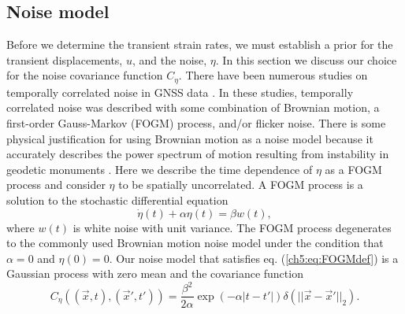 \subsection{Noise model}\label{ch5:sec:NoiseModel}
Before we determine the transient strain rates, we must establish a
prior for the transient displacements, $u$, and the noise, $\eta$. In
this section we discuss our choice for the noise covariance function
$C_\eta$. There have been numerous studies on temporally correlated
noise in GNSS data \citep[e.g.,][]{Zhang1997, Mao1999, Williams2004,
Langbein2008}. In these studies, temporally correlated noise was
described with some combination of Brownian motion, a first-order
Gauss-Markov (FOGM) process, and/or flicker noise. There is some
physical justification for using Brownian motion as a noise model
because it accurately describes the power spectrum of motion resulting
from instability in geodetic monuments \citep[e.g.,][]{Wyatt1982,
Wyatt1989}. Here we describe the time dependence of $\eta$ as a FOGM
process and consider $\eta$ to be spatially uncorrelated. A FOGM
process is a solution to the stochastic differential equation
\begin{equation}\label{ch5:eq:FOGMdef}
\dot{\eta}(t) + \alpha \eta(t) = \beta w(t),
\end{equation}
where $w(t)$ is white noise with unit variance. The FOGM process
degenerates to the commonly used Brownian motion noise model under the
condition that $\alpha=0$ and $\eta(0) = 0$. Our noise model that
satisfies eq. (\ref{ch5:eq:FOGMdef}) is a Gaussian process with zero
mean and the covariance function
\begin{equation}\label{ch5:eq:FOGM}
C_\eta\left((\vec{x},t),(\vec{x}',t')\right) = \frac{\beta^2}{2\alpha}\exp\left(-\alpha|t - t'|\right) \delta(||\vec{x} - \vec{x}'||_2). 
\end{equation}

